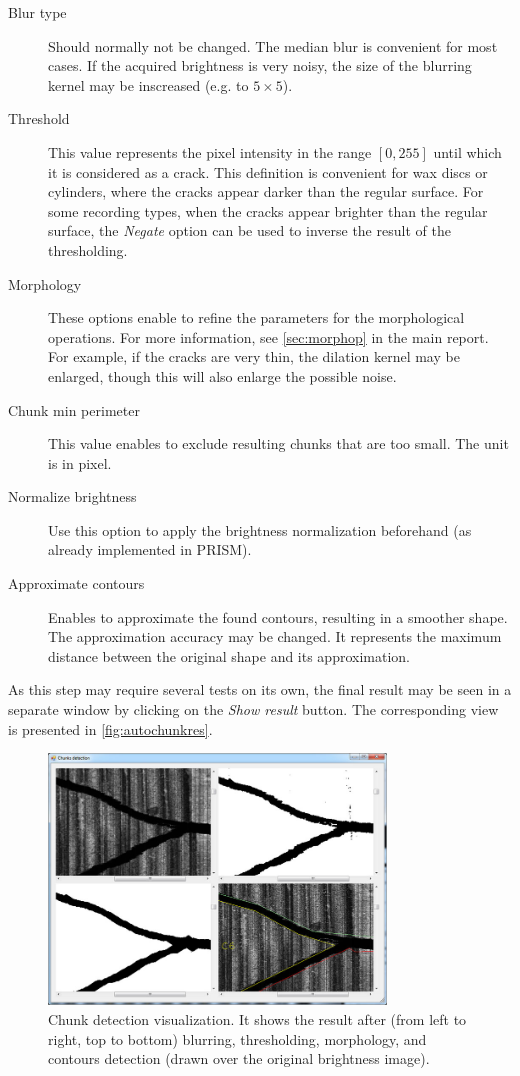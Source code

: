 \begin{description}
\item[Blur type] Should normally not be changed. The median blur is convenient for most cases. If the acquired brightness is very noisy, the size of the blurring kernel may be inscreased (e.g. to $5 \times 5$).
\item[Threshold] This value represents the pixel intensity in the range $[0,255]$ until which it is considered as a crack. This definition is convenient for wax discs or cylinders, where the cracks appear darker than the regular surface. For some recording types, when the cracks appear brighter than the regular surface, the \emph{Negate} option can be used to inverse the result of the thresholding.
\item[Morphology] These options enable to refine the parameters for the morphological operations. For more information, see \autoref{sec:morphop} in the main report. For example, if the cracks are very thin, the dilation kernel may be enlarged, though this will also enlarge the possible noise.
\item[Chunk min perimeter] This value enables to exclude resulting chunks that are too small. The unit is in pixel.
\item[Normalize brightness] Use this option to apply the brightness normalization beforehand (as already implemented in PRISM).
\item[Approximate contours] Enables to approximate the found contours, resulting in a smoother shape. The approximation accuracy may be changed. It represents the maximum distance between the original shape and its approximation.
\end{description}

As this step may require several tests on its own, the final result may be seen in a separate window by clicking on the \emph{Show result} button. The corresponding view is presented in \autoref{fig:autochunkres}.

\begin{figure}[!ht]
\centering
\includegraphics[width=0.8\textwidth]{images/auto-chunk-res}
\caption[Chunk detection visualization.]
{Chunk detection visualization. It shows the result after (from left to right, top to bottom) blurring, thresholding, morphology, and contours detection (drawn over the original brightness image).}
\label{fig:autochunkres}
\end{figure}


